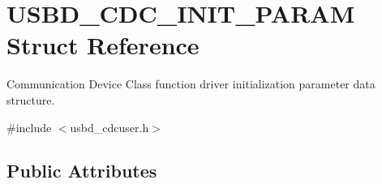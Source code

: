 \hypertarget{struct_u_s_b_d___c_d_c___i_n_i_t___p_a_r_a_m}{}\section{U\+S\+B\+D\+\_\+\+C\+D\+C\+\_\+\+I\+N\+I\+T\+\_\+\+P\+A\+R\+AM Struct Reference}
\label{struct_u_s_b_d___c_d_c___i_n_i_t___p_a_r_a_m}


Communication Device Class function driver initialization parameter data structure.  




{\ttfamily \#include $<$usbd\+\_\+cdcuser.\+h$>$}

\subsection*{Public Attributes}
